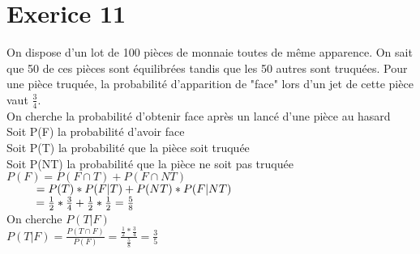 \documentclass{article}
\author{Frederic Becerril}
\newcommand\tab[1][1cm]{\hspace*{#1}}
\begin{document}
\part*{Exerice 11}

On dispose d'un lot de 100 pièces de monnaie toutes de même apparence. On sait que 50 de
ces pièces sont équilibrées tandis que les 50 autres sont truquées. Pour une pièce truquée, la
probabilité d'apparition de "face" lors d'un jet de cette pièce vaut $\frac{3}{4}$.\\
On cherche la probabilité d'obtenir face après un lancé d'une pièce au hasard\\
Soit P(F) la probabilité d'avoir face\\
Soit P(T) la probabilité que la pièce soit truquée\\
Soit P(NT) la probabilité que la pièce ne soit pas truquée\\
$P(F) = P(F \cap T) + P(F \cap NT)$\\
$\tab[0.9cm] = P(T) * P(F|T) + P(NT) * P(F|NT)$\\
$\tab[0.9cm] = \frac{1}{2} * \frac{3}{4} + \frac{1}{2} * \frac{1}{2} = \frac{5}{8}$\\
On cherche $P(T|F)$\\
$P(T|F) = \frac{P(T \cap F)}{P(F)} = \frac{\frac{1}{2} * \frac{3}{4}}{\frac{5}{8}} = \frac{3}{5}$
\end{document}
